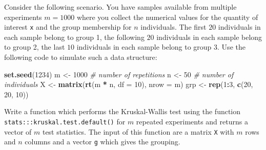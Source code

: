 \documentclass[
]{article}
\newenvironment{Shaded}{\begin{snugshade}}{\end{snugshade}}
\newcommand{\AttributeTok}[1]{\textcolor[rgb]{0.13,0.29,0.53}{#1}}
\newcommand{\CommentTok}[1]{\textcolor[rgb]{0.56,0.35,0.01}{\textit{#1}}}
\newcommand{\ControlFlowTok}[1]{\textcolor[rgb]{0.13,0.29,0.53}{\textbf{#1}}}
\newcommand{\DecValTok}[1]{\textcolor[rgb]{0.00,0.00,0.81}{#1}}
\newcommand{\FunctionTok}[1]{\textcolor[rgb]{0.13,0.29,0.53}{\textbf{#1}}}
\newcommand{\NormalTok}[1]{#1}
\newcommand{\OtherTok}[1]{\textcolor[rgb]{0.56,0.35,0.01}{#1}}
\newcommand{\SpecialCharTok}[1]{\textcolor[rgb]{0.81,0.36,0.00}{\textbf{#1}}}
\begin{document}
Consider the following scenario. You have samples available from
multiple experiments \(m=1000\) where you collect the numerical values
for the quantity of interest \texttt{x} and the group membership for
\(n\) individuals. The first \(20\) individuals in each sample belong to
group 1, the following \(20\) individuals in each sample belong to group
2, the last \(10\) individuals in each sample belong to group 3. Use the
following code to simulate such a data structure:

\begin{Shaded}
\begin{Highlighting}[]
\FunctionTok{set.seed}\NormalTok{(}\DecValTok{1234}\NormalTok{)}
\NormalTok{m }\OtherTok{\textless{}{-}} \DecValTok{1000} \CommentTok{\# number of repetitions}
\NormalTok{n }\OtherTok{\textless{}{-}} \DecValTok{50}   \CommentTok{\# number of individuals}
\NormalTok{X }\OtherTok{\textless{}{-}} \FunctionTok{matrix}\NormalTok{(}\FunctionTok{rt}\NormalTok{(m }\SpecialCharTok{*}\NormalTok{ n, }\AttributeTok{df =} \DecValTok{10}\NormalTok{), }\AttributeTok{nrow =}\NormalTok{ m)}
\NormalTok{grp }\OtherTok{\textless{}{-}} \FunctionTok{rep}\NormalTok{(}\DecValTok{1}\SpecialCharTok{:}\DecValTok{3}\NormalTok{, }\FunctionTok{c}\NormalTok{(}\DecValTok{20}\NormalTok{, }\DecValTok{20}\NormalTok{, }\DecValTok{10}\NormalTok{))}
\end{Highlighting}
\end{Shaded}

Write a function which performs the Kruskal-Wallis test using the
function \texttt{stats:::kruskal.test.default()} for \(m\) repeated
experiments and returns a vector of \(m\) test statistics. The input of
this function are a matrix \texttt{X} with \(m\) rows and \(n\) columns
and a vector \texttt{g} which gives the grouping.

\begin{Shaded}
\end{Shaded}
\end{document}
